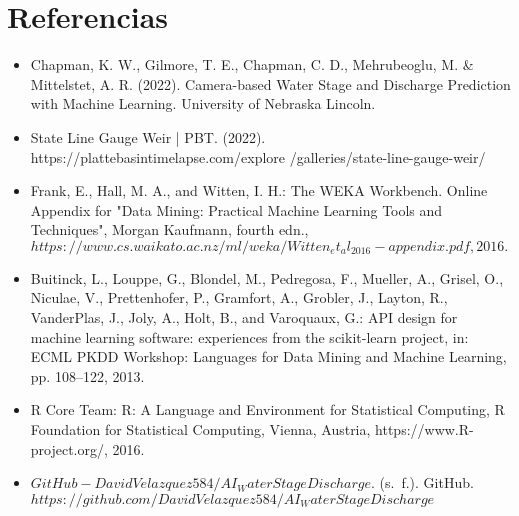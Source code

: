 \documentclass[../main.tex]{subfiles}
\begin{document}
\section{Referencias}

\begin{itemize}

    \item Chapman, K. W., Gilmore, T. E., Chapman, C. D., Mehrubeoglu, M. & Mittelstet, A. R. (2022). Camera-based Water Stage and Discharge Prediction with Machine Learning. University of Nebraska Lincoln.

    \item State Line Gauge Weir | PBT. (2022). https://plattebasintimelapse.com/explore /galleries/state-line-gauge-weir/

    \item Frank, E., Hall, M. A., and Witten, I. H.: The WEKA Workbench. Online Appendix for "Data Mining: Practical Machine Learning Tools and Techniques", Morgan Kaufmann, fourth edn., $https://www.cs.waikato.ac.nz/ml/weka/Witten_et_al_2016-appendix.pdf, 2016.$
    
    \item Buitinck, L., Louppe, G., Blondel, M., Pedregosa, F., Mueller, A., Grisel, O., Niculae, V., Prettenhofer, P., Gramfort, A., Grobler, J., Layton, R., VanderPlas, J., Joly, A., Holt, B., and Varoquaux, G.: API design for machine learning software: experiences from the scikit-learn project, in: ECML PKDD Workshop: Languages for Data Mining and Machine Learning, pp. 108–122, 2013.
    
    \item R Core Team: R: A Language and Environment for Statistical Computing, R Foundation for Statistical Computing, Vienna, Austria, https://www.R-project.org/, 2016.

    \item $GitHub - DavidVelazquez584/AI_WaterStageDischarge.$ (s. f.). GitHub. $https://github.com/DavidVelazquez584/AI_WaterStageDischarge$

\end{itemize}
\end{document}
